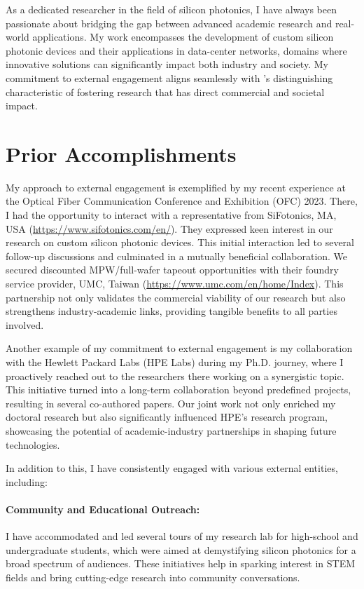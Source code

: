 As a dedicated researcher in the field of silicon photonics, I have always been passionate about bridging the gap between advanced academic research and real-world applications. My work encompasses the development of custom silicon photonic devices and their applications in data-center networks,  domains where innovative solutions can significantly impact both industry and society. My commitment to external engagement aligns seamlessly with \appEngager{}’s distinguishing characteristic of fostering research that has direct commercial and societal impact.

\section{Prior Accomplishments}
My approach to external engagement is exemplified by my recent experience at the Optical Fiber Communication Conference and Exhibition (OFC) 2023. There, I had the opportunity to interact with a representative from SiFotonics, MA, USA (\url{https://www.sifotonics.com/en/}). They expressed keen interest in our research on custom silicon photonic devices. This initial interaction led to several follow-up discussions and culminated in a mutually beneficial collaboration. We secured discounted MPW/full-wafer tapeout opportunities with their foundry service provider, UMC, Taiwan (\url{https://www.umc.com/en/home/Index}). This partnership not only validates the commercial viability of our research but also strengthens industry-academic links, providing tangible benefits to all parties involved.

Another example of my commitment to external engagement is my collaboration with the Hewlett Packard Labs (HPE Labs) during my Ph.D. journey, where I proactively reached out to the researchers there working on a synergistic topic. This initiative turned into a long-term collaboration beyond predefined projects, resulting in several co-authored papers. Our joint work not only enriched my doctoral research but also significantly influenced HPE's research program, showcasing the potential of academic-industry partnerships in shaping future technologies.

In addition to this, I have consistently engaged with various external entities, including:

\paragraph{Community and Educational Outreach:} I have accommodated and led several tours of my research lab for high-school and undergraduate students, which were aimed at demystifying silicon photonics for a broad spectrum of audiences. These initiatives help in sparking interest in STEM fields and bring cutting-edge research into community conversations.

